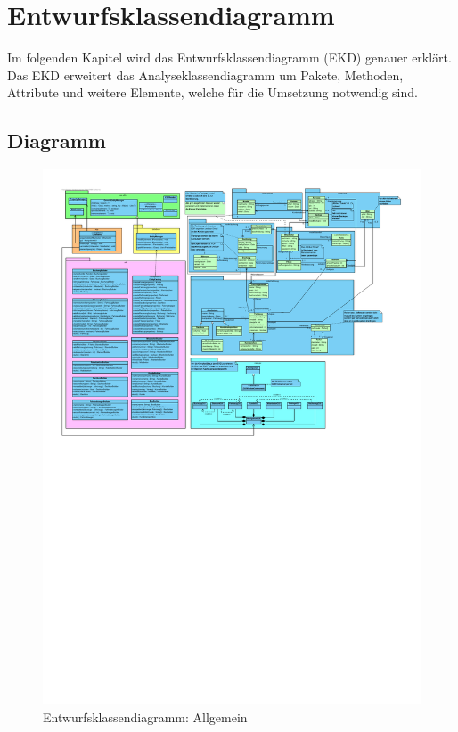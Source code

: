 \chapter{Entwurfsklassendiagramm}

Im folgenden Kapitel wird das Entwurfsklassendiagramm (EKD) genauer erklärt. Das EKD erweitert das Analyseklassendiagramm um Pakete, Methoden, Attribute und weitere Elemente, welche für die Umsetzung notwendig sind.

\section{Diagramm}

\begin{figure}[!ht]
    \centering
    \includegraphics[width=\textwidth, trim = 0cm 14cm 0cm 0cm]{Bilder/Diagramme/Entwurfsklassendiagramm_v2.pdf}
    \caption{Entwurfsklassendiagramm: Allgemein}
    \label{img:ekd}
\end{figure}

